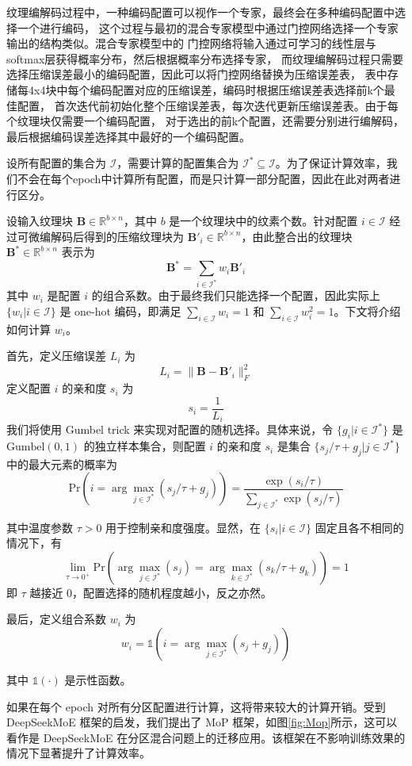 纹理编解码过程中，一种编码配置可以视作一个专家，最终会在多种编码配置中选择一个进行编码，
这个过程与最初的混合专家模型中通过门控网络选择一个专家输出的结构类似。混合专家模型中的
门控网络将输入通过可学习的线性层与softmax层获得概率分布，然后根据概率分布选择专家，
而纹理编解码过程只需要选择压缩误差最小的编码配置，因此可以将门控网络替换为压缩误差表，
表中存储每4x4块中每个编码配置对应的压缩误差，编码时根据压缩误差表选择前k个最佳配置，
首次迭代前初始化整个压缩误差表，每次迭代更新压缩误差表。由于每个纹理块仅需要一个编码配置，
对于选出的前k个配置，还需要分别进行编解码，最后根据编码误差选择其中最好的一个编码配置。

设所有配置的集合为 $\mathcal{I}$，需要计算的配置集合为 $\mathcal{I}^*\subseteq \mathcal{I}$。为了保证计算效率，我们不会在每个epoch中计算所有配置，而是只计算一部分配置，因此在此对两者进行区分。

设输入纹理块 $\mathbf{B}\in\mathbb{R}^{b\times n}$，其中 $b$ 是一个纹理块中的纹素个数。针对配置 $i\in\mathcal{I}$ 经过可微编解码后得到的压缩纹理块为 $\mathbf{B}'_i\in\mathbb{R}^{b\times n}$，由此整合出的纹理块 $\mathbf{B}^*\in\mathbb{R}^{b\times n}$ 表示为
$$
\mathbf{B}^*=\sum_{i\in\mathcal{I}^*} w_i\mathbf{B}'_i
$$
其中 $w_i$ 是配置 $i$ 的组合系数。由于最终我们只能选择一个配置，因此实际上 $\{w_i|i\in\mathcal{I}\}$ 是 one-hot 编码，即满足 $\sum_{i\in\mathcal{I}}w_i=1$ 和 $\sum_{i\in\mathcal{I}}w_i^2=1$。下文将介绍如何计算 $w_i$。

首先，定义压缩误差 $L_i$ 为
$$
L_i=\|\mathbf{B}-\mathbf{B}'_i\|_F^2
$$
定义配置 $i$ 的亲和度 $s_i$ 为
$$
s_i=\frac{1}{L_i}
$$
我们将使用 Gumbel trick 来实现对配置的随机选择。具体来说，令 $\{g_i|i\in\mathcal{I}^*\}$ 是 $\text{Gumbel}(0,1)$ 的独立样本集合，则配置 $i$ 的亲和度 $s_i$ 是集合 $\{s_j/\tau+g_j|j\in\mathcal{I}^*\}$ 中的最大元素的概率为
$$
\text{Pr}(i=\arg\max_{j\in\mathcal{I}^*}(s_j/\tau+g_j))=\frac{\exp(s_i/\tau)}{\sum_{j\in\mathcal{I}^*} \exp(s_j/\tau)}
$$

其中温度参数 $\tau>0$ 用于控制亲和度强度。显然，在 $\{s_i|i\in\mathcal{I}\}$ 固定且各不相同的情况下，有
$$
\lim_{\tau\to 0^+}\text{Pr}\left(\arg\max_{j\in\mathcal{I}^*}(s_j)=\arg\max_{k\in\mathcal{I}^*}(s_k/\tau+g_k)\right)=1
$$
即 $\tau$ 越接近 0，配置选择的随机程度越小，反之亦然。

最后，定义组合系数 $w_i$ 为
$$
w_i=\mathbb{1}(i=\arg\max_{j\in\mathcal{I}^*}(s_j+g_j))
$$

其中 $\mathbb{1}(\cdot)$ 是示性函数。

如果在每个 epoch 对所有分区配置进行计算，这将带来较大的计算开销。受到 DeepSeekMoE 框架的启发，我们提出了 MoP 框架，如图\ref{fig:Mop}所示，这可以看作是 DeepSeekMoE 在分区混合问题上的迁移应用。该框架在不影响训练效果的情况下显著提升了计算效率。

